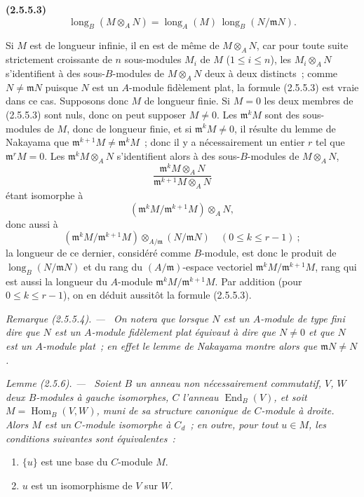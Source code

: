 \documentclass[10pt,oneside]{book}
\newenvironment{env}[1][]{\par\medskip\noindent\textbf{(#1)}\ }{\par}
\newenvironment{remark}[1][]{%
  \par\medskip\noindent\itshape Remarque (#1). ---\ }{\par}
\newenvironment{lemma}[1][]{%
  \par\medskip\noindent\itshape Lemme (#1). ---\ }{\par}
\begin{document}
\begin{env}[2.5.5.3]
\label{IV.2.5.5.3-fr}
\[
\operatorname{long}_B(M\otimes_A N)
=\operatorname{long}_A(M)\,
 \operatorname{long}_B(N/\mathfrak mN).
\]
\end{env}

Si $M$ est de longueur infinie, il en est de même de $M\otimes_A N$, car
pour toute suite strictement croissante de $n$ sous-modules $M_i$ de $M$
($1\leq i\leq n$), les $M_i\otimes_A N$ s'identifient à des sous-$B$-modules
de $M\otimes_A N$ deux à deux distincts~; comme
$N\ne\mathfrak mN$ puisque $N$ est un $A$-module fidèlement plat, la formule
(2.5.5.3) est vraie dans ce cas. Supposons donc $M$ de longueur finie. Si
$M=0$ les deux membres de (2.5.5.3) sont nuls, donc on peut supposer
$M\ne0$. Les $\mathfrak m^kM$ sont des sous-modules de $M$, donc de longueur
finie, et si $\mathfrak m^kM\ne0$, il résulte du lemme de Nakayama que
$\mathfrak m^{k+1}M\ne\mathfrak m^kM$~; donc il y a nécessairement un entier
$r$ tel que $\mathfrak m^rM=0$. Les
$\mathfrak m^kM\otimes_A N$ s'identifient alors à des sous-$B$-modules de
$M\otimes_A N$,
\[
\frac{\mathfrak m^kM\otimes_A N}{\mathfrak m^{k+1}M\otimes_A N}
\]
étant isomorphe à
\[
(\mathfrak m^kM/\mathfrak m^{k+1}M)\otimes_A N,
\]
donc aussi à
\[
(\mathfrak m^kM/\mathfrak m^{k+1}M)
\otimes_{A/\mathfrak m}(N/\mathfrak mN)
\quad(0\leq k\leq r-1)~;
\]
la longueur de ce dernier, considéré comme $B$-module, est donc le produit de
$\operatorname{long}_B(N/\mathfrak mN)$ et du rang du
$(A/\mathfrak m)$-espace vectoriel
$\mathfrak m^kM/\mathfrak m^{k+1}M$, rang qui est aussi la longueur du
$A$-module $\mathfrak m^kM/\mathfrak m^{k+1}M$. Par addition (pour
$0\leq k\leq r-1$), on en déduit aussitôt la formule (2.5.5.3).

\begin{remark}[2.5.5.4]
\label{IV.2.5.5.4-fr}
On notera que lorsque $N$ est un $A$-module \emph{de type fini} dire que $N$
est un $A$-module fidèlement plat équivaut à dire que $N\ne0$ et que $N$ est
un $A$-module plat~; en effet le lemme de Nakayama montre alors que
$\mathfrak mN\ne N$.
\end{remark}

\begin{lemma}[2.5.6]
\label{IV.2.5.6-fr}
Soient $B$ un anneau non nécessairement commutatif, $V$, $W$ deux
$B$-modules à gauche isomorphes, $C$ l'anneau
$\operatorname{End}_B(V)$, et soit
$M=\operatorname{Hom}_B(V,W)$, muni de sa structure canonique de
$C$-module à droite. Alors $M$ est un $C$-module isomorphe à $C_d$~; en
outre, pour tout $u\in M$, les conditions suivantes sont équivalentes~:
\begin{enumerate}
\item[\emph{a)}] $\{u\}$ est une base du $C$-module $M$.
\item[\emph{b)}] $u$ est un isomorphisme de $V$ sur $W$.
\end{enumerate}
\end{lemma}
\end{document}
